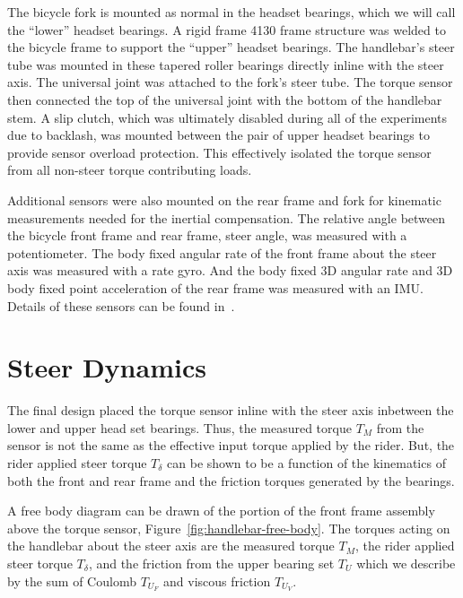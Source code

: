 \documentclass[10pt]{article}
\begin{document}
The bicycle fork is mounted as normal in the headset bearings, which we will
call the ``lower'' headset bearings. A rigid frame 4130 frame structure was
welded to the bicycle frame to support the ``upper'' headset bearings. The
handlebar's steer tube was mounted in these tapered roller bearings directly
inline with the steer axis. The universal joint was attached to the fork's
steer tube. The torque sensor then connected the top of the universal joint
with the bottom of the handlebar stem. A slip clutch, which was ultimately
disabled during all of the experiments due to backlash, was mounted between the
pair of upper headset bearings to provide sensor overload protection. This
effectively isolated the torque sensor from all non-steer torque contributing
loads.

Additional sensors were also mounted on the rear frame and fork for kinematic
measurements needed for the inertial compensation. The relative angle between
the bicycle front frame and rear frame, steer angle, was measured with a
potentiometer. The body fixed angular rate of the front frame about the steer
axis was measured with a rate gyro. And the body fixed 3D angular rate and 3D
body fixed point acceleration of the rear frame was measured with an IMU.
Details of these sensors can be found in~\cite{Moore2012}.


\section*{Steer Dynamics}
\label{sec:steer-dynamics}


The final design placed the torque sensor inline with the steer axis inbetween
the lower and upper head set bearings. Thus, the measured torque $T_M$ from the
sensor is not the same as the effective input torque applied by the rider. But,
the rider applied steer torque $T_\delta$ can be shown to be a function of the
kinematics of both the front and rear frame and the friction torques generated
by the bearings.

A free body diagram can be drawn of the portion of the front frame assembly
above the torque sensor, Figure~\ref{fig:handlebar-free-body}. The torques
acting on the handlebar about the steer axis are the measured torque $T_M$, the
rider applied steer torque $T_\delta$, and the friction from the upper bearing
set $T_U$ which we describe by the sum of Coulomb $T_{U_F}$ and viscous
friction $T_{U_V}$.
\end{document}
